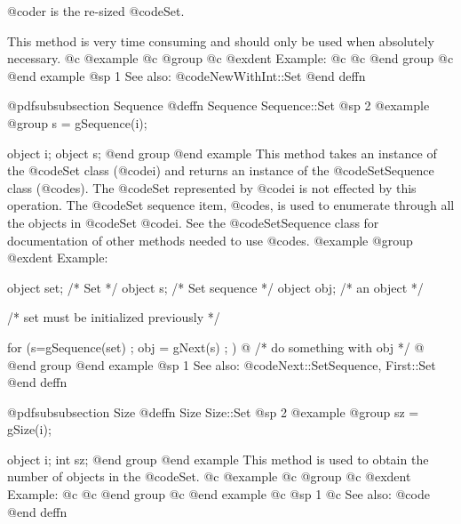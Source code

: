 @code{r} is the re-sized @code{Set}.

This method is very time consuming and should only be used when
absolutely necessary.
@c @example
@c @group
@c @exdent Example:
@c 
@c @end group
@c @end example
@sp 1
See also:  @code{NewWithInt::Set}
@end deffn











@pdfsubsubsection {Sequence}
@deffn {Sequence} Sequence::Set
@sp 2
@example
@group
s = gSequence(i);

object  i;
object  s;
@end group
@end example
This method takes an instance of the @code{Set} class (@code{i})
and returns an instance of the @code{SetSequence} class
(@code{s}).  The @code{Set} represented by @code{i} is not effected by
this operation.  The @code{Set} sequence item, @code{s}, is used to enumerate
through all the objects in @code{Set} @code{i}.  See the
@code{SetSequence} class for documentation of other methods
needed to use @code{s}.
@example
@group
@exdent Example:

object  set; /*  Set           */
object  s;   /*  Set sequence  */
object  obj; /*  an object     */

/*  set must be initialized previously  */

for (s=gSequence(set) ; obj = gNext(s) ; )  @{
        /*  do something with obj  */
@}
@end group
@end example
@sp 1
See also:  @code{Next::SetSequence, First::Set}
@end deffn




















@pdfsubsubsection {Size}
@deffn {Size} Size::Set
@sp 2
@example
@group
sz = gSize(i);

object  i;
int     sz;
@end group
@end example
This method is used to obtain the number of objects in the @code{Set}.
@c @example
@c @group
@c @exdent Example:
@c 
@c @end group
@c @end example
@c @sp 1
@c See also:  @code{}
@end deffn










